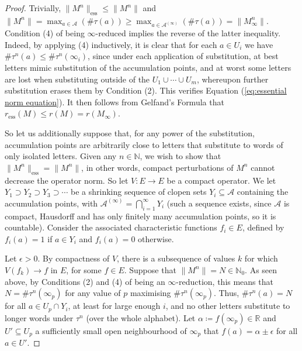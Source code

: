 \documentclass[11pt]{amsart}
\numberwithin{equation}{section}
\theoremstyle{plain}
\theoremstyle{definition}
\newcommand{\R}{{\mathbb R}}
\newcommand{\N}{{\mathbb N}}
\newcommand{\mc}{\mathcal}
\newcommand{\A}{\mc A}
\begin{document}
\begin{proof}
Trivially, \(\| M^n \|_\mathrm{ess} \leq \| M^n \|\) and \( \|M^n\| = \max_{a \in \A} (\# \tau(a)) \geq \max_{a \in \A^{(\infty)}} (\# \tau(a)) = \|M_\infty^n\|\). Condition (4) of being \(\infty\)-reduced implies the reverse of the latter inequality. Indeed, by applying (4) inductively, it is clear that for each \(a \in U_i\) we have \(\# \tau^n(a) \leq \# \tau^n(\infty_i)\), since under each application of substitution, at best letters mimic substitution of the accumulation points, and at worst some letters are lost when substituting outside of the \(U_1 \cup \cdots \cup U_m\), whereupon further substitution erases them by Condition (2). This verifies Equation (\ref{eq:essential norm equation}). It then follows from Gelfand's Formula that \(r_\mathrm{ess}(M) \leq r(M) = r(M_\infty)\).

So let us additionally suppose that, for any power of the substitution, accumulation points are arbitrarily close to letters that substitute to words of only isolated letters. Given any \(n \in \N\), we wish to show that \(\| M^n \|_\mathrm{ess} = \| M^n \|\), in other words, compact perturbations of \(M^n\) cannot decrease the operator norm. So let \(V \colon E \to E\) be a compact operator. We let \(Y_1 \supset Y_2 \supset Y_3 \supset \cdots\) be a shrinking sequence of clopen sets \(Y_i \subseteq \A\) containing the accumulation points, with \(\A^{(\infty)} = \bigcap_{i = 1}^\infty Y_i\) (such a sequence exists, since \(\A\) is compact, Hausdorff and has only finitely many accumulation points, so it is countable). Consider the associated characteristic functions \(f_i \in E\), defined by \(f_i(a) = 1\) if \(a \in Y_i\) and \(f_i(a) = 0\) otherwise.

Let \(\epsilon > 0\). By compactness of \(V\), there is a subsequence of values \(k\) for which \(V(f_k) \to f\) in \(E\), for some \(f \in E\). Suppose that \(\|M^n\| = N \in \N_0\). As seen above, by Conditions (2) and (4) of being an \(\infty\)-reduction, this means that \(N = \# \tau^n(\infty_p)\) for any value of \(p\) maximising \(\# \tau^n(\infty_p)\). Thus, \(\# \tau^n(a) = N\) for all \(a \in U_p \cap Y_i\), at least for large enough \(i\), and no other letters substitute to longer words under \(\tau^n\) (over the whole alphabet). Let \(\alpha \coloneqq f(\infty_p) \in \R\) and \(U' \subseteq U_p\) a sufficiently small open neighbourhood of \(\infty_p\) that \(f(a) = \alpha \pm \epsilon\) for all \(a \in U'\).


\end{proof}
\end{document}
